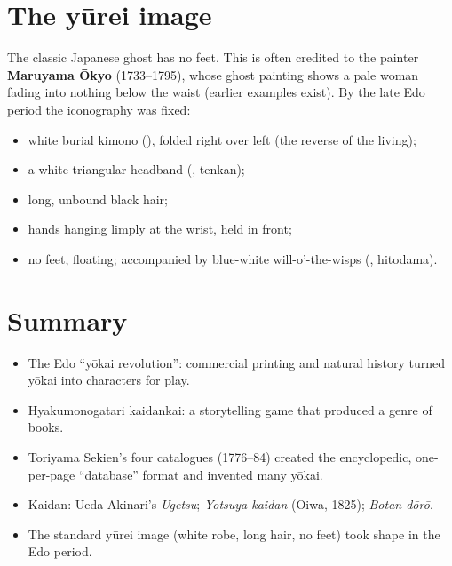 \section{The yūrei image}

The classic Japanese ghost has no feet. This is often credited to the painter \textbf{Maruyama
Ōkyo} (1733--1795), whose ghost painting shows a pale woman fading into nothing below the
waist (earlier examples exist). By the late Edo period the iconography was fixed:

\begin{itemize}
  \item white burial kimono (), folded right over left (the reverse of the living);
  \item a white triangular headband (, tenkan);
  \item long, unbound black hair;
  \item hands hanging limply at the wrist, held in front;
  \item no feet, floating; accompanied by blue-white will-o'-the-wisps (, hitodama).
\end{itemize}

\section*{Summary}
\begin{itemize}
  \item The Edo ``yōkai revolution'': commercial printing and natural history turned yōkai
        into characters for play.
  \item Hyakumonogatari kaidankai: a storytelling game that produced a genre of books.
  \item Toriyama Sekien's four catalogues (1776--84) created the encyclopedic, one-per-page
        ``database'' format and invented many yōkai.
  \item Kaidan: Ueda Akinari's \emph{Ugetsu}; \emph{Yotsuya kaidan} (Oiwa, 1825);
        \emph{Botan dōrō}.
  \item The standard yūrei image (white robe, long hair, no feet) took shape in the Edo period.
\end{itemize}
